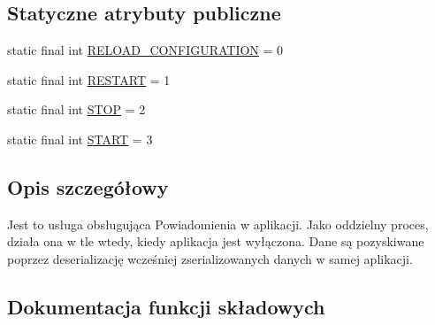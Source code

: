 \subsection*{Statyczne atrybuty publiczne}
\begin{DoxyCompactItemize}
\item 
static final int \hyperlink{classpl_1_1edu_1_1uwb_1_1mobiuwb_1_1services_1_1notification_1_1_notification_service_af47344f5ea5a7674e704c31b630a855c}{R\+E\+L\+O\+A\+D\+\_\+\+C\+O\+N\+F\+I\+G\+U\+R\+A\+T\+I\+O\+N} = 0
\item 
static final int \hyperlink{classpl_1_1edu_1_1uwb_1_1mobiuwb_1_1services_1_1notification_1_1_notification_service_a7df660c9c1caae313b35c79d7b90316e}{R\+E\+S\+T\+A\+R\+T} = 1
\item 
static final int \hyperlink{classpl_1_1edu_1_1uwb_1_1mobiuwb_1_1services_1_1notification_1_1_notification_service_ae809e18e9060af52219971019a948626}{S\+T\+O\+P} = 2
\item 
static final int \hyperlink{classpl_1_1edu_1_1uwb_1_1mobiuwb_1_1services_1_1notification_1_1_notification_service_ae57cee289223135a2aaf9c711f54b689}{S\+T\+A\+R\+T} = 3
\end{DoxyCompactItemize}


\subsection{Opis szczegółowy}
Jest to usługa obsługująca Powiadomienia w aplikacji. Jako oddzielny proces, działa ona w tle wtedy, kiedy aplikacja jest wyłączona. Dane są pozyskiwane poprzez deserializację wcześniej zserializowanych danych w samej aplikacji. 

\subsection{Dokumentacja funkcji składowych}
\hypertarget{classpl_1_1edu_1_1uwb_1_1mobiuwb_1_1services_1_1notification_1_1_notification_service_a88df922180b31377225feb105eec8d3e}{}
